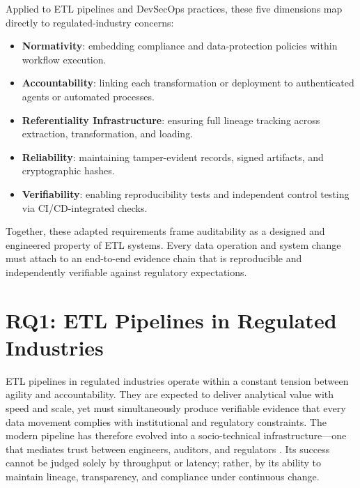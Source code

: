 Applied to ETL pipelines and DevSecOps practices, these five dimensions map
directly to regulated-industry concerns:
\begin{itemize}
  \item \textbf{Normativity}: embedding compliance and data-protection policies
  within workflow execution.
  \item \textbf{Accountability}: linking each transformation or deployment to
  authenticated agents or automated processes.
  \item \textbf{Referentiality Infrastructure}: ensuring full lineage tracking
  across extraction, transformation, and loading.
  \item \textbf{Reliability}: maintaining tamper-evident records, signed
  artifacts, and cryptographic hashes.
  \item \textbf{Verifiability}: enabling reproducibility tests and independent
  control testing via CI/CD-integrated checks.
\end{itemize}

Together, these adapted requirements frame auditability as a designed and
engineered property of ETL systems. Every data operation and system change must
attach to an end-to-end evidence chain that is reproducible and independently
verifiable against regulatory expectations.

\section{RQ1: ETL Pipelines in Regulated Industries}

ETL pipelines in regulated industries operate within a constant tension between
agility and accountability. They are expected to deliver analytical value with
speed and scale, yet must simultaneously produce verifiable evidence that every
data movement complies with institutional and regulatory constraints. The modern
pipeline has therefore evolved into a socio-technical infrastructure—one that
mediates trust between engineers, auditors, and regulators
\cite{mahmud_role_2022, elbaghazaoui_data_2025-1}. Its success cannot be judged
solely by throughput or latency; rather, by its ability to maintain lineage,
transparency, and compliance under continuous change.

